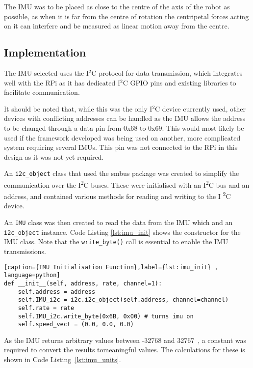 The IMU was to be placed as close to the centre of the axis of the robot
as possible, as when it is far from the centre of rotation the centripetal
forces acting on it can interfere and be measured as linear motion away
from the centre.

\subsection{Implementation}\label{elec/imu/impl}
The IMU selected uses the I$^2$C protocol for data transmission, which
integrates well with the RPi as it has dedicated I$^2$C GPIO pins and
existing libraries to facilitate communication.

It should be noted that, while this was the only I$^2$C device currently
used, other devices with conflicting addresses can be handled as the IMU
allows the address to be changed through a data pin from 0x68 to 0x69.
This would most likely be used if the framework developed was being used
on another, more complicated system requiring several IMUs. This pin was
not connected to the RPi in this design as it was not yet required.

An \verb|i2c_object| class that used the smbus package was created to
simplify the communication over the I\textsuperscript{2}C buses. These
were initialised with an I\textsuperscript{2}C bus and an address, and
contained various methods for reading and writing to the I
\textsuperscript{2}C device.


An \verb|IMU| class was then created to read the data from the IMU which
and an \verb|i2c_object| instance. Code Listing \ref{lst:imu_init} shows
the constructor for the IMU class. Note that the \verb|write_byte()| call
is essential to enable the IMU transmissions.

\begin{lstlisting}[caption={IMU Initialisation Function},label={lst:imu_init} , language=python]
def __init__(self, address, rate, channel=1):
    self.address = address
    self.IMU_i2c = i2c.i2c_object(self.address, channel=channel)
    self.rate = rate
    self.IMU_i2c.write_byte(0x6B, 0x00) # turns imu on
    self.speed_vect = (0.0, 0.0, 0.0)
\end{lstlisting}

As the IMU returns arbitrary values between -32768 and 32767~\cite{MPU6050Datasheet},
a constant was required to convert the results tomeaningful values. The calculations for
these is shown in Code Listing~\ref{lst:imu_units}.

